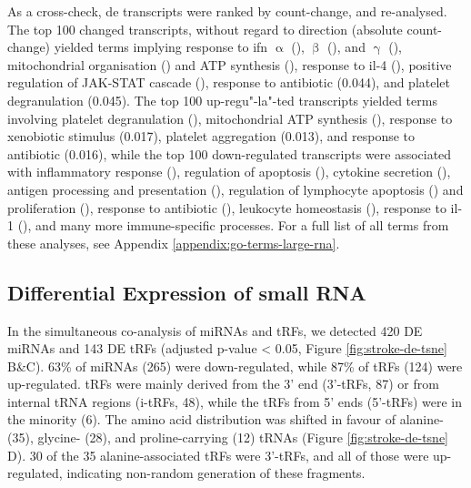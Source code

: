 As a cross-check, \ac{de} transcripts were ranked by count-change, and re-analysed. The top 100 changed transcripts, without regard to direction (absolute count-change) yielded terms implying response to \ac{ifn} $\upalpha$ (), $\upbeta$ (), and $\upgamma$ (), mitochondrial organisation () and ATP synthesis (), response to \ac{il}-4 (), positive regulation of JAK-STAT cascade (), response to antibiotic (0.044), and platelet degranulation (0.045). The top 100 up-regu"-la"-ted transcripts yielded terms involving platelet degranulation (), mitochondrial ATP synthesis (), response to xenobiotic stimulus (0.017), platelet aggregation (0.013), and response to antibiotic (0.016), while the top 100 down-regulated transcripts were associated with inflammatory response (), regulation of apoptosis (), cytokine secretion (), antigen processing and presentation (), regulation of lymphocyte apoptosis () and proliferation (), response to antibiotic (), leukocyte homeostasis (), response to \ac{il}-1 (), and many more immune-specific processes. For a full list of all terms from these analyses, see Appendix \ref{appendix:go-terms-large-rna}. 

\subsection{Differential Expression of small RNA}
In the simultaneous co-analysis of miRNAs and tRFs, we detected 420 DE miRNAs and 143 DE tRFs (adjusted p-value < 0.05, Figure \ref{fig:stroke-de-tsne}\,B\&C). 63\% of miRNAs (265) were down-regulated, while 87\% of tRFs (124) were up-regulated. tRFs were mainly derived from the 3' end (3'-tRFs, 87) or from internal tRNA regions (i-tRFs, 48), while the tRFs from 5' ends (5'-tRFs) were in the minority (6). The amino acid distribution was shifted in favour of alanine- (35), glycine- (28), and proline-carrying (12) tRNAs (Figure \ref{fig:stroke-de-tsne}\,D). 30 of the 35 alanine-associated tRFs were 3'-tRFs, and all of those were up-regulated, indicating non-random generation of these fragments.

